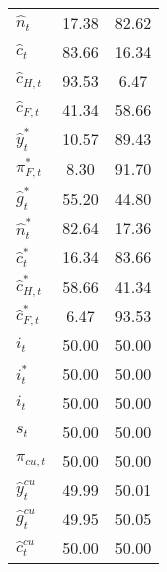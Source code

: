 \begin{center}
\begin{longtable}{lcc}
${\hat n_t}               $	 & 	             17.38	 & 	             82.62 \\ 
${\hat c_t}               $	 & 	             83.66	 & 	             16.34 \\ 
${\hat c_{H,t}}           $	 & 	             93.53	 & 	              6.47 \\ 
${\hat c_{F,t}}           $	 & 	             41.34	 & 	             58.66 \\ 
${\hat y_t^*}             $	 & 	             10.57	 & 	             89.43 \\ 
${\pi_{F,t}^*}            $	 & 	              8.30	 & 	             91.70 \\ 
${\hat g_t^*}             $	 & 	             55.20	 & 	             44.80 \\ 
${\hat n_t^*}             $	 & 	             82.64	 & 	             17.36 \\ 
${\hat c_t^*}             $	 & 	             16.34	 & 	             83.66 \\ 
${\hat c_{H,t}^*}         $	 & 	             58.66	 & 	             41.34 \\ 
${\hat c_{F,t}^*}         $	 & 	              6.47	 & 	             93.53 \\ 
${i_t}                    $	 & 	             50.00	 & 	             50.00 \\ 
${i_t^*}                  $	 & 	             50.00	 & 	             50.00 \\ 
${i_t}                    $	 & 	             50.00	 & 	             50.00 \\ 
${s_t}                    $	 & 	             50.00	 & 	             50.00 \\ 
${\pi_{cu,t}}             $	 & 	             50.00	 & 	             50.00 \\ 
${\hat y_t^{cu}}          $	 & 	             49.99	 & 	             50.01 \\ 
${\hat g_t^{cu}}          $	 & 	             49.95	 & 	             50.05 \\ 
${\hat c_t^{cu}}          $	 & 	             50.00	 & 	             50.00 \\ 
\end{longtable}
 \end{center}
